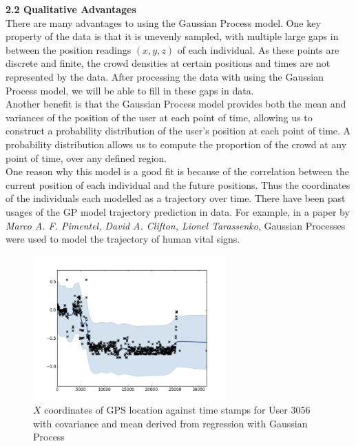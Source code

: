 \documentclass[letterpaper]{article}
\begin{document}
{\bf2.2  Qualitative Advantages} \\

There are many advantages to using the Gaussian Process model. One key property of the data is that it is unevenly sampled, with multiple large gaps in between the position readings $(x,y,z)$ of each individual. As these points are discrete and finite, the crowd densities at certain positions and times are not represented by the data. After processing the data with using the Gaussian Process model, we will be able to fill in these gaps in data. \\

Another benefit is that the Gaussian Process model provides both the mean and variances of the position of the user at each point of time, allowing us to construct a probability distribution of the user's position at each point of time. A probability distribution allows us to compute the proportion of the crowd at any point of time, over any defined region. \\

One reason why this model is a good fit is because of the correlation between the current position of each individual and the future positions. Thus the coordinates of the individuals each modelled as a trajectory over time. There have been past usages of the GP model trajectory prediction in data. For example, in a paper by {\it Marco A. F. Pimentel, David A. Clifton, Lionel Tarassenko}, Gaussian Processes were used to model the trajectory of human vital signs. \\

\begin{figure}[h!]
  \centering
    \includegraphics[width=280px,natwidth=634,natheight=442]{selected_GP/3056.csv_X.png}
  \caption{$X$ coordinates of GPS location against time stamps for User 3056 with covariance and mean derived from regression with Gaussian Process}
  \label{fig:GP1}
\end{figure}
\end{document}
